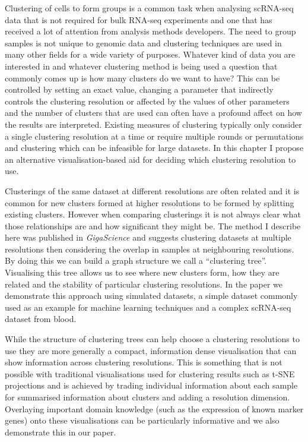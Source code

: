 \documentclass[11pt,a4paper,titlepage,twoside,openright]{style/unimelbthesis}
\theoremstyle{definition}
\theoremstyle{definition}
\theoremstyle{definition}
\theoremstyle{remark}
\begin{document}
\begin{mainmatter}
Clustering of cells to form groups is a common task when analysing scRNA-seq data that is not required for bulk RNA-seq experiments and one that has received a lot of attention from analysis methods developers. The need to group samples is not unique to genomic data and clustering techniques are used in many other fields for a wide variety of purposes. Whatever kind of data you are interested in and whatever clustering method is being used a question that commonly comes up is how many clusters do we want to have? This can be controlled by setting an exact value, changing a parameter that indirectly controls the clustering resolution or affected by the values of other parameters and the number of clusters that are used can often have a profound affect on how the results are interpreted. Existing measures of clustering typically only consider a single clustering resolution at a time or require multiple rounds or permutations and clustering which can be infeasible for large datasets. In this chapter I propose an alternative visualisation-based aid for deciding which clustering resolution to use.

Clusterings of the same dataset at different resolutions are often related and it is common for new clusters formed at higher resolutions to be formed by splitting existing clusters. However when comparing clusterings it is not always clear what those relationships are and how significant they might be. The method I describe here was published in \emph{GigaScience} and suggests clustering datasets at multiple resolutions then considering the overlap in samples at neighbouring resolutions. By doing this we can build a graph structure we call a ``clustering tree''. Visualising this tree allows us to see where new clusters form, how they are related and the stability of particular clustering resolutions. In the paper we demonstrate this approach using simulated datasets, a simple dataset commonly used as an example for machine learning techniques and a complex scRNA-seq dataset from blood.

While the structure of clustering trees can help choose a clustering resolutions to use they are more generally a compact, information dense visualisation that can show information across clustering resolutions. This is something that is not possible with traditional visualisations used for clustering results such as t-SNE projections and is achieved by trading individual information about each sample for summarised information about clusters and adding a resolution dimension. Overlaying important domain knowledge (such as the expression of known marker genes) onto these visualisations can be particularly informative and we also demonstrate this in our paper.


\end{mainmatter}
\end{document}
